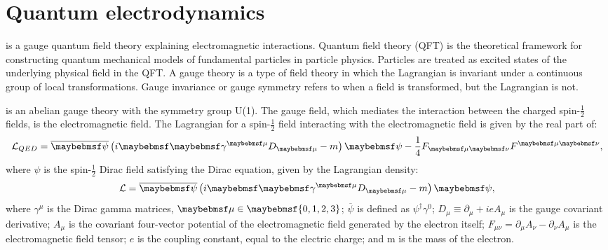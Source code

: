\section{Quantum electrodynamics}


 \QED is a gauge quantum field theory explaining electromagnetic interactions. Quantum field theory (QFT) is the theoretical framework for constructing quantum mechanical models of fundamental particles in particle physics. Particles are treated as excited states of the underlying physical field in the QFT.  A gauge theory is a type of field theory in which the Lagrangian is invariant under a continuous group of local transformations.  Gauge invariance or gauge symmetry refers to when a field is transformed, but the Lagrangian is not.

\QED is an abelian gauge theory with the symmetry group U(1). The gauge field, which mediates the interaction between the charged spin-$\frac{1}{2}$ fields, is the electromagnetic field. The \QED Lagrangian \cite{peskin1995introduction} for a spin-$\frac{1}{2}$ field interacting with the electromagnetic field is given by the real part of:
\begin{equation}
\Lagr_{QED} = \overline{\psi} \left( i\Dstroke - m \right)\psi -  \frac{1}{4}F_{\mu\nu}F^{\mu\nu},
\end{equation}
where $\psi$ is the spin-$\frac{1}{2}$ Dirac field satisfying the Dirac equation, given by the Lagrangian density:
\begin{equation}
\Lagr =  \overline{\psi} \left( i\Dstroke - m \right)\psi,
\end{equation}
where $\gamma^{\mu}$ is the Dirac gamma matrices, $\mu\in\braces{0,1,2,3}$; $\overline{\psi}$ is defined as $\psi^{\dagger}\gamma^0$; $D_{\mu} \equiv \partial_{\mu} + ieA_{\mu}$ is the gauge covariant derivative; $A_{\mu}$ is the covariant four-vector potential of the electromagnetic field generated by the electron itself;  $F_{\mu\nu} = \partial_{\mu}A_{\nu} - \partial_{\nu}A_{\mu}$ is the electromagnetic field tensor; $e$ is the coupling constant, equal to the electric charge; and m is the mass of the electron.



